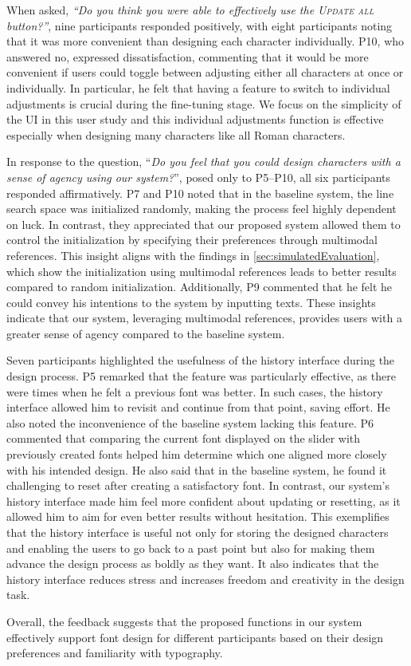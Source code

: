 When asked, \textit{``Do you think you were able to effectively use the \textsc{Update all} button?''}, nine participants responded positively, with eight participants noting that it was more convenient than designing each character individually.
P10, who answered no, expressed dissatisfaction, commenting that it would be more convenient if users could toggle between adjusting either all characters at once or individually. 
In particular, he felt that having a feature to switch to individual adjustments is crucial during the fine-tuning stage.
We focus on the simplicity of the UI in this user study and this individual adjustments function is effective especially when designing many characters like all Roman characters.

In response to the question, ``\textit{Do you feel that you could design characters with a sense of agency using our system?}'', posed only to P5--P10, all six participants responded affirmatively.
P7 and P10 noted that in the baseline system, the line search space was initialized randomly, making the process feel highly dependent on luck. 
In contrast, they appreciated that our proposed system allowed them to control the initialization by specifying their preferences through multimodal references.
This insight aligns with the findings in \autoref{sec:simulatedEvaluation}, which show the initialization using multimodal references leads to better results compared to random initialization.
Additionally, P9 commented that he felt he could convey his intentions to the system by inputting texts.
These insights indicate that our system, leveraging multimodal references, provides users with a greater sense of agency compared to the baseline system.

Seven participants highlighted the usefulness of the history interface during the design process.
P5 remarked that the feature was particularly effective, as there were times when he felt a previous font was better.
In such cases, the history interface allowed him to revisit and continue from that point, saving effort.
He also noted the inconvenience of the baseline system lacking this feature.
P6 commented that comparing the current font displayed on the slider with previously created fonts helped him determine which one aligned more closely with his intended design.
He also said that in the baseline system, he found it challenging to reset after creating a satisfactory font.
In contrast, our system's history interface made him feel more confident about updating or resetting, as it allowed him to aim for even better results without hesitation.
This exemplifies that the history interface is useful not only for storing the designed characters and enabling the users to go back to a past point but also for making them advance the design process as boldly as they want.
It also indicates that the history interface reduces stress and increases freedom and creativity in the design task.

Overall, the feedback suggests that the proposed functions in our system effectively support font design for different participants based on their design preferences and familiarity with typography.
